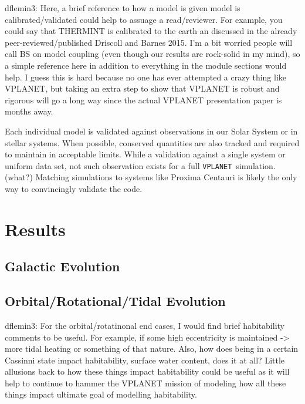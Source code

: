\documentclass[preprint,12pt]{aastex}
\newcommand{\xxx}[1]{{\color{red} #1}} %
\newcommand{\xxx}[1]{{\color{red} #1}} %
\def\vplanet{\texttt{\footnotesize{VPLANET}}\xspace}
\begin{document}
\xxx{dflemin3: Here, a brief reference to how a model is given model is calibrated/validated
could help to assuage a read/reviewer.  For example, you could say that THERMINT is calibrated
to the earth an discussed in the already peer-reviewed/published Driscoll and Barnes 2015.  I'm a bit 
worried people will call BS on model coupling (even though our results are rock-solid in my mind), so
a simple reference here in addition to everything in the module sections would help.  I guess this is hard because
no one has ever attempted a crazy thing like VPLANET, but taking an extra step to show that VPLANET is robust
and rigorous will go a long way since the actual VPLANET presentation paper is months away.}

Each individual model is validated against observations in our Solar
System or in stellar systems. When possible, conserved quantities are
also tracked and \xxx{required to maintain in acceptable limits}. \xxx{While a
validation against a single system or uniform data set, not such
observation exists for a full \vplanet~simulation. (what?)} Matching
simulations to systems like Proxima Centauri is likely the only way to
\xxx{convincingly} validate the code.

\section{Results\label{sec:results}}

\subsection{Galactic Evolution}
\label{sec:results:galactic}


\subsection{Orbital/Rotational/Tidal Evolution}
\label{sec:results:orbital}

\xxx{dflemin3: For the orbital/rotatinonal end cases, I would find brief habitability comments to be useful.  For example,
if some high eccentricity is maintained -> more tidal heating or something of that nature.  Also, how does being in a certain
Cassinni state impact habitability, surface water content, does it at all?  Little allusions back to how these things impact
habitability could be useful as it will help to continue to hammer the VPLANET mission of modeling how all these things
impact ultimate goal of modelling habitability.}
\end{document}
